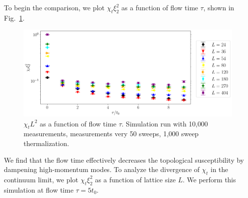 To begin the comparison, we plot $\chi_t\xi_2^2$ as a function of flow time $\tau$, shown in Fig.~\ref{fig:bietenholz}.
\begin{figure}[h]
    \centering
      \includegraphics[width=\textwidth]{imgs/bietenholz.png}
      \caption{\label{fig:bietenholz} $\chi_t L^2$ as a  function of flow time $\tau$. Simulation run with 10,000 measurements, measurements very 50 sweeps, 1,000 sweep thermalization.}
\end{figure}
We find that the flow time effectively decreases the topological susceptibility by dampening high-momentum modes. To analyze the divergence of $\chi_t$ in the continuum limit, we plot $\chi_t \xi_2^2$ as a function of lattice size $L$. We perform this simulation at flow time $\tau=5t_0$.
